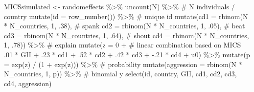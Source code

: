\documentclass[
  letterpaper,
  DIV=11,
  numbers=noendperiod]{scrreprt}
\newenvironment{Shaded}{\begin{snugshade}}{\end{snugshade}}
\newcommand{\AttributeTok}[1]{\textcolor[rgb]{0.40,0.45,0.13}{#1}}
\newcommand{\CommentTok}[1]{\textcolor[rgb]{0.37,0.37,0.37}{#1}}
\newcommand{\DecValTok}[1]{\textcolor[rgb]{0.68,0.00,0.00}{#1}}
\newcommand{\FunctionTok}[1]{\textcolor[rgb]{0.28,0.35,0.67}{#1}}
\newcommand{\NormalTok}[1]{\textcolor[rgb]{0.00,0.23,0.31}{#1}}
\newcommand{\OtherTok}[1]{\textcolor[rgb]{0.00,0.23,0.31}{#1}}
\newcommand{\SpecialCharTok}[1]{\textcolor[rgb]{0.37,0.37,0.37}{#1}}
\begin{document}
\begin{Shaded}
\begin{Highlighting}[]
\NormalTok{MICSsimulated }\OtherTok{\textless{}{-}}\NormalTok{ randomeffects }\SpecialCharTok{\%\textgreater{}\%} 
  \FunctionTok{uncount}\NormalTok{(N) }\SpecialCharTok{\%\textgreater{}\%} \CommentTok{\# N individuals / country}
  \FunctionTok{mutate}\NormalTok{(}\AttributeTok{id =} \FunctionTok{row\_number}\NormalTok{()) }\SpecialCharTok{\%\textgreater{}\%} \CommentTok{\# unique id}
  \FunctionTok{mutate}\NormalTok{(}\AttributeTok{cd1 =} \FunctionTok{rbinom}\NormalTok{(N }\SpecialCharTok{*}\NormalTok{ N\_countries, }\DecValTok{1}\NormalTok{, .}\DecValTok{38}\NormalTok{), }\CommentTok{\# spank}
         \AttributeTok{cd2 =} \FunctionTok{rbinom}\NormalTok{(N }\SpecialCharTok{*}\NormalTok{ N\_countries, }\DecValTok{1}\NormalTok{, .}\DecValTok{05}\NormalTok{), }\CommentTok{\# beat}
         \AttributeTok{cd3 =} \FunctionTok{rbinom}\NormalTok{(N }\SpecialCharTok{*}\NormalTok{ N\_countries, }\DecValTok{1}\NormalTok{, .}\DecValTok{64}\NormalTok{), }\CommentTok{\# shout}
         \AttributeTok{cd4 =} \FunctionTok{rbinom}\NormalTok{(N }\SpecialCharTok{*}\NormalTok{ N\_countries, }\DecValTok{1}\NormalTok{, .}\DecValTok{78}\NormalTok{)) }\SpecialCharTok{\%\textgreater{}\%} \CommentTok{\# explain}
  \FunctionTok{mutate}\NormalTok{(}\AttributeTok{z =} \DecValTok{0} \SpecialCharTok{+} \CommentTok{\# linear combination based on MICS}
\NormalTok{           .}\DecValTok{01} \SpecialCharTok{*}\NormalTok{ GII }\SpecialCharTok{+}
\NormalTok{           .}\DecValTok{23} \SpecialCharTok{*}\NormalTok{ cd1 }\SpecialCharTok{+}
\NormalTok{           .}\DecValTok{52} \SpecialCharTok{*}\NormalTok{ cd2 }\SpecialCharTok{+}
\NormalTok{           .}\DecValTok{42} \SpecialCharTok{*}\NormalTok{ cd3 }\SpecialCharTok{+}
           \SpecialCharTok{{-}}\NormalTok{.}\DecValTok{21} \SpecialCharTok{*}\NormalTok{ cd4 }\SpecialCharTok{+} 
\NormalTok{           u0) }\SpecialCharTok{\%\textgreater{}\%}
  \FunctionTok{mutate}\NormalTok{(}\AttributeTok{p =} \FunctionTok{exp}\NormalTok{(z) }\SpecialCharTok{/}\NormalTok{ (}\DecValTok{1} \SpecialCharTok{+} \FunctionTok{exp}\NormalTok{(z))) }\SpecialCharTok{\%\textgreater{}\%} \CommentTok{\# probability}
  \FunctionTok{mutate}\NormalTok{(}\AttributeTok{aggression =} \FunctionTok{rbinom}\NormalTok{(N }\SpecialCharTok{*}\NormalTok{ N\_countries, }\DecValTok{1}\NormalTok{, p)) }\SpecialCharTok{\%\textgreater{}\%} \CommentTok{\# binomial y}
  \FunctionTok{select}\NormalTok{(id, country, GII,}
\NormalTok{         cd1, cd2, cd3, cd4, }
\NormalTok{         aggression)}
\end{Highlighting}
\end{Shaded}
\end{document}
